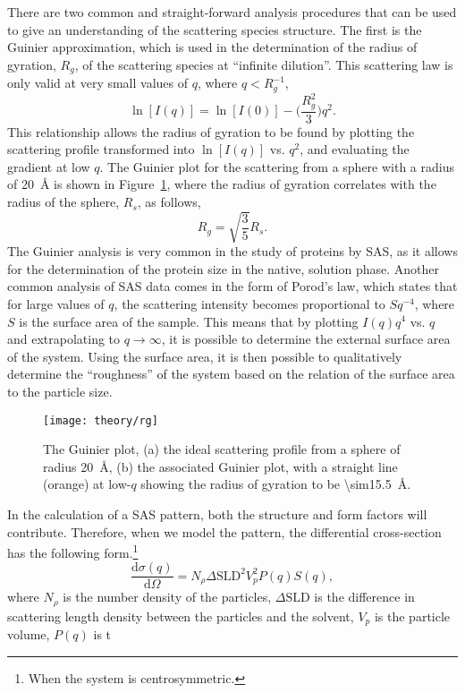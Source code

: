 There are two common and straight-forward analysis procedures that can be used to give an understanding of the scattering species structure.
The first is the Guinier approximation, which is used in the determination of the radius of gyration, $R_g$, of the scattering species at ``infinite dilution''.
This scattering law is only valid at very small values of $q$, where $q < R_g^{-1}$,\autocite{sivia_elementary_2011}
%
\begin{equation}
    \ln[I(q)] = \ln[I(0)] - \Bigg(\frac{R_g^2}{3}\Bigg)q^2.
\end{equation}
%
This relationship allows the radius of gyration to be found by plotting the scattering profile transformed into $\ln[I(q)]$ vs. $q^2$, and evaluating the gradient at low $q$.
The Guinier plot for the scattering from a sphere with a radius of \SI{20}{\angstrom} is shown in Figure~\ref{fig:rg}, where the radius of gyration correlates with the radius of the sphere, $R_s$, as follows,
%
\begin{equation}
    R_g = \sqrt{\frac{3}{5}}R_s.
\end{equation}
%
The Guinier analysis is very common in the study of proteins by SAS, as it allows for the determination of the protein size in the native, solution phase.\autocite{skou_synchrotron-based_2014}
Another common analysis of SAS data comes in the form of Porod's law, which states that for large values of $q$, the scattering intensity becomes proportional to $Sq^{-4}$, where $S$ is the surface area of the sample.
This means that by plotting $I(q)q^4$ vs. $q$ and extrapolating to $q \rightarrow \infty$, it is possible to determine the external surface area of the system.\autocite{willis_experimental_2009}
Using the surface area, it is then possible to qualitatively determine the ``roughness'' of the system based on the relation of the surface area to the particle size.
%
\begin{figure}
    \centering
    \texttt{[image: theory/rg]}
    \caption{The Guinier plot, (a) the ideal scattering profile from a sphere of radius \SI{20}{\angstrom}, (b) the associated Guinier plot, with a straight line (orange) at low-$q$ showing the radius of gyration to be \SI{\sim15.5}{\angstrom}.}
    \label{fig:rg}
\end{figure}
%

In the calculation of a SAS pattern, both the structure and form factors will contribute.
Therefore, when we model the pattern, the differential cross-section has the following form.\footnote{When the system is centrosymmetric.}
%
\begin{equation}
    \frac{\text{d}\sigma(q)}{\text{d}\Omega} = N_\rho\Delta\text{SLD}^2V_p^2 P(q)S(q),
\end{equation}
%
where $N_\rho$ is the number density of the particles, $\Delta\text{SLD}$ is the difference in scattering length density between the particles and the solvent, $V_p$ is the particle volume, $P(q)$ is t